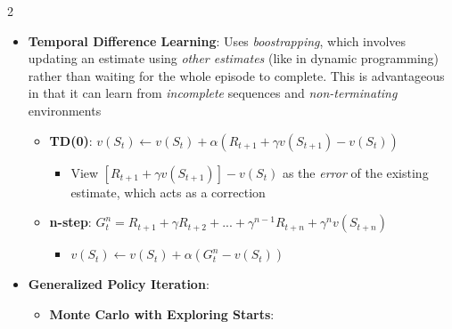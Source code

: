 \documentclass{article}
\providecommand{\tightlist}{%
  \setlength{\itemsep}{\GlobalItemSep}\setlength{\parskip}{\GlobalListParSkip}}
\newlength{\GlobalItemSep}
\newlength{\GlobalListParSkip}
\begin{document}
\begin{multicols}{2}
\begin{itemize}
\begin{itemize}
\begin{itemize}
\begin{itemize}
        \begin{itemize}
        \tightlist
        \item
          \(G \leftarrow \gamma G + R_{t+1}\)
        \item
          Append \(G\) to \(Returns(S_t)\)
        \item
          \(V(S_t) \leftarrow \text{average}(Returns(S_t))\)
        \end{itemize}
      \end{itemize}
    \end{itemize}
  \item
    Can use an incremental mean:
    \(\mu_t = \frac{1}{t} \sum_{j=1}^t x_j = \mu_{t-1} + \frac{1}{t}(x_t - \mu_{t-1})\)
  \end{itemize}
\item
  \textbf{Temporal Difference Learning}: Uses \emph{boostrapping}, which
  involves updating an estimate using \emph{other estimates} (like in
  dynamic programming) rather than waiting for the whole episode to
  complete. This is advantageous in that it can learn from
  \emph{incomplete} sequences and \emph{non-terminating} environments

  \begin{itemize}
  \tightlist
  \item
    \textbf{TD(0)}:
    \(v(S_t) \leftarrow v(S_t) + \alpha (R_{t+1} + \gamma v(S_{t+1}) - v(S_t))\)

    \begin{itemize}
    \tightlist
    \item
      View \([R_{t+1} + \gamma v(S_{t+1})] - v(S_t)\) as the
      \emph{error} of the existing estimate, which acts as a correction
    \end{itemize}
  \item
    \textbf{n-step}:
    \(G_t^n = R_{t+1} + \gamma R_{t+2} + ... + \gamma^{n-1}R_{t+n} + \gamma^n v(S_{t+n})\)

    \begin{itemize}
    \tightlist
    \item
      \(v(S_t) \leftarrow v(S_t) + \alpha(G^n_t - v(S_t))\)
    \end{itemize}
  \end{itemize}
\item
  \textbf{Generalized Policy Iteration}:

  \begin{itemize}
  \tightlist
  \item
    \textbf{Monte Carlo with Exploring Starts}:


\end{itemize}
\end{itemize}
\end{multicols}
\end{document}
